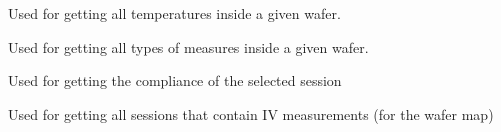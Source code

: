 \documentclass[letterpaper,10pt,english]{sphinxmanual}
\begin{document}

\begin{fulllineitems}
\label{\detokenize{app:app.get_all_temps}}
\pysigstartsignatures
{}
\pysigstopsignatures
\sphinxAtStartPar
Used for getting all temperatures inside a given wafer.

\end{fulllineitems}


\begin{fulllineitems}
\label{\detokenize{app:app.get_all_types}}
\pysigstartsignatures
{}
\pysigstopsignatures
\sphinxAtStartPar
Used for getting all types of measures inside a given wafer.

\end{fulllineitems}


\begin{fulllineitems}
\label{\detokenize{app:app.get_compl}}
\pysigstartsignatures
{}
\pysigstopsignatures
\sphinxAtStartPar
Used for getting the compliance of the selected session

\end{fulllineitems}


\begin{fulllineitems}
\label{\detokenize{app:app.get_map_sessions_server}}
\pysigstartsignatures
{}
\pysigstopsignatures
\sphinxAtStartPar
Used for getting all sessions that contain I\sphinxhyphen{}V measurements (for the wafer map)

\end{fulllineitems}
\end{document}
